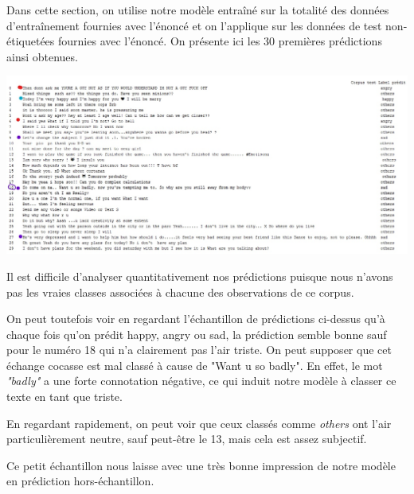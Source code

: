 Dans cette section, on utilise notre modèle entraîné sur la totalité des données d'entraînement fournies avec l'énoncé et on l'applique sur les données de test non-étiquetées fournies avec l'énoncé. On présente ici les 30 premières prédictions ainsi obtenues.

\includegraphics[width=\linewidth,keepaspectratio]{images/couleur_predictions}

Il est difficile d'analyser quantitativement nos prédictions puisque nous n'avons pas les vraies classes associées à chacune des observations de ce corpus.

On peut toutefois voir en regardant l'échantillon de prédictions ci-dessus qu'à chaque fois qu'on prédit happy, angry ou sad, la prédiction semble bonne sauf pour le numéro 18 qui n'a clairement pas l'air triste. On peut supposer que cet échange cocasse est mal classé à cause de "Want u so badly". En effet, le mot \emph{"badly"} a une forte connotation négative, ce qui induit notre modèle à classer ce texte en tant que triste.

En regardant rapidement, on peut voir que ceux classés comme \emph{others} ont l'air particulièrement neutre, sauf peut-être le 13, mais cela est assez subjectif.

Ce petit échantillon nous laisse avec une très bonne impression de notre modèle en prédiction hors-échantillon.
